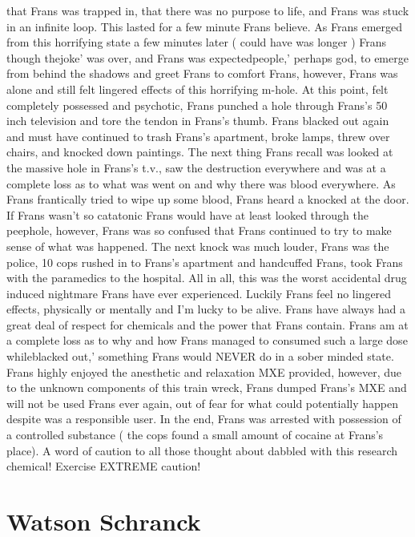 \documentclass[12pt]{book}
\begin{document}
that Frans was trapped in, that there was no purpose to life, and Frans was stuck in an infinite loop. This lasted for a few minute Frans believe. As Frans emerged from this horrifying state a few minutes later ( could have was longer ) Frans though thejoke' was over, and Frans was expectedpeople,' perhaps god, to emerge from behind the shadows and greet Frans to comfort Frans, however, Frans was alone and still felt lingered effects of this horrifying m-hole. At this point, felt completely possessed and psychotic, Frans punched a hole through Frans's 50 inch television and tore the tendon in Frans's thumb. Frans blacked out again and must have continued to trash Frans's apartment, broke lamps, threw over chairs, and knocked down paintings. The next thing Frans recall was looked at the massive hole in Frans's t.v., saw the destruction everywhere and was at a complete loss as to what was went on and why there was blood everywhere. As Frans frantically tried to wipe up some blood, Frans heard a knocked at the door. If Frans wasn't so catatonic Frans would have at least looked through the peephole, however, Frans was so confused that Frans continued to try to make sense of what was happened. The next knock was much louder, Frans was the police, 10 cops rushed in to Frans's apartment and handcuffed Frans, took Frans with the paramedics to the hospital. All in all, this was the worst accidental drug induced nightmare Frans have ever experienced. Luckily Frans feel no lingered effects, physically or mentally and I'm lucky to be alive. Frans have always had a great deal of respect for chemicals and the power that Frans contain. Frans am at a complete loss as to why and how Frans managed to consumed such a large dose whileblacked out,' something Frans would NEVER do in a sober minded state. Frans highly enjoyed the anesthetic and relaxation MXE provided, however, due to the unknown components of this train wreck, Frans dumped Frans's MXE and will not be used Frans ever again, out of fear for what could potentially happen despite was a responsible user. In the end, Frans was arrested with possession of a controlled substance ( the cops found a small amount of cocaine at Frans's place). A word of caution to all those thought about dabbled with this research chemical! Exercise EXTREME caution!



\chapter{Watson Schranck}
\end{document}
